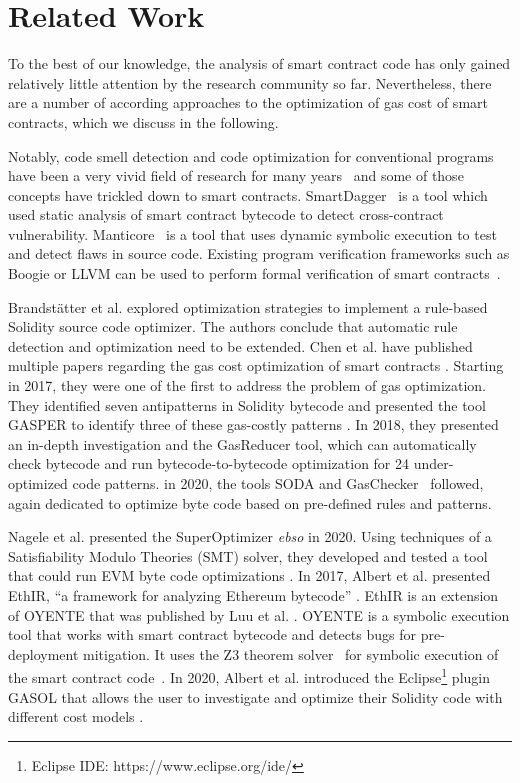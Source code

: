\documentclass[10pt,conference]{IEEEtran}
\begin{document}
	\section{Related Work}
	\label{sec:related}
	
	To the best of our knowledge, the analysis of smart contract code has only gained relatively little attention by the research community so far. Nevertheless, there are a number of according approaches to the optimization of gas cost of smart contracts, which we discuss in the following. 
	
	Notably, code smell detection and code optimization for conventional programs have been a very vivid field of research for many years~\cite{codesmellmining} and some of those concepts have trickled down to smart contracts. SmartDagger~\cite{smartdagger} is a tool which used static analysis of smart contract bytecode to detect cross-contract vulnerability. Manticore~\cite{manticore} is a tool that uses dynamic symbolic execution to test and detect flaws in source code. Existing program verification frameworks such as Boogie or LLVM can be used to perform formal verification of smart contracts~\cite{formalverification}.
	
	
	Brandstätter et al. \cite{brandstatter} explored optimization strategies to implement a rule-based Solidity source code optimizer. The authors conclude that automatic rule detection and optimization need to be extended. Chen et al. have published multiple papers regarding the gas cost optimization of smart contracts \cite{chen1devour, chen2gaschecker, chen3soda, chen4stan}. Starting in 2017, they were one of the first to address the problem of gas optimization. They identified seven antipatterns in Solidity bytecode and presented the tool GASPER to identify three of these gas-costly patterns \cite{chen1devour}. In 2018, they presented an in-depth investigation and the GasReducer tool, which can automatically check bytecode and run bytecode-to-bytecode optimization for 24 under-optimized code patterns. in 2020, the tools SODA \cite{chen3soda} and GasChecker~\cite{chen2gaschecker} followed, again dedicated to optimize byte code based on pre-defined rules and patterns. 
	
	Nagele et al. presented the SuperOptimizer \textit{ebso} in 2020. Using techniques of a Satisfiability Modulo Theories (SMT) solver, they developed and tested a tool that could run EVM byte code optimizations \cite{nagele}. In 2017, Albert et al. presented EthIR, ``a framework for analyzing Ethereum bytecode'' \cite{ethir}. EthIR is an extension of OYENTE that was published by Luu et al. \cite{oyente}. OYENTE is a symbolic execution tool that works with smart contract bytecode and detects bugs for pre-deployment mitigation. It uses the Z3 theorem solver~\cite{z3solver} for symbolic execution of the smart contract code~\cite{oyente}. In 2020, Albert et al. introduced the Eclipse\footnote{Eclipse IDE: https://www.eclipse.org/ide/} plugin GASOL that allows the user to investigate and optimize their Solidity code with different cost models \cite{gasol}.
	
\end{document}
